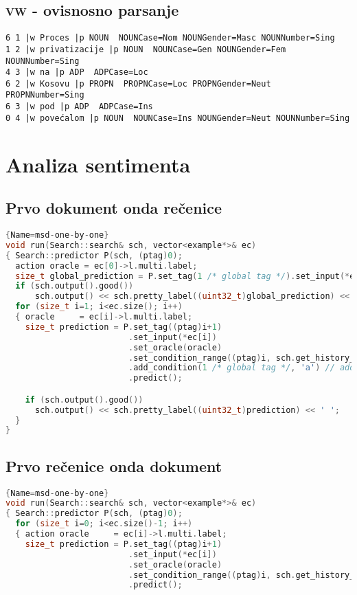 \begin{appendix}
\section{\textsc{vw} - ovisnosno parsanje}
\begin{lstlisting}[basicstyle=\tiny\ttfamily]
6 1 |w Proces |p NOUN  NOUNCase=Nom NOUNGender=Masc NOUNNumber=Sing
1 2 |w privatizacije |p NOUN  NOUNCase=Gen NOUNGender=Fem NOUNNumber=Sing
4 3 |w na |p ADP  ADPCase=Loc
6 2 |w Kosovu |p PROPN  PROPNCase=Loc PROPNGender=Neut PROPNNumber=Sing
6 3 |w pod |p ADP  ADPCase=Ins
0 4 |w povećalom |p NOUN  NOUNCase=Ins NOUNGender=Neut NOUNNumber=Sing
\end{lstlisting}

\chapter{Analiza sentimenta}\label{appendix:sentiment}
\section{Prvo dokument onda rečenice}
\begin{lstlisting}[language=C++,
                   basicstyle=\tiny\ttfamily]{Name=msd-one-by-one}
void run(Search::search& sch, vector<example*>& ec)
{ Search::predictor P(sch, (ptag)0);
  action oracle = ec[0]->l.multi.label;
  size_t global_prediction = P.set_tag(1 /* global tag */).set_input(*ec[0]).set_oracle(oracle).predict();
  if (sch.output().good())
      sch.output() << sch.pretty_label((uint32_t)global_prediction) << ' ';
  for (size_t i=1; i<ec.size(); i++)
  { oracle     = ec[i]->l.multi.label;
    size_t prediction = P.set_tag((ptag)i+1)
                         .set_input(*ec[i])
                         .set_oracle(oracle)
                         .set_condition_range((ptag)i, sch.get_history_length(), 'p')
                         .add_condition(1 /* global tag */, 'a') // adds the global as condition on each sequence element
                         .predict();

    if (sch.output().good())
      sch.output() << sch.pretty_label((uint32_t)prediction) << ' ';
  }
}
\end{lstlisting}
\section{Prvo rečenice onda dokument}
\begin{lstlisting}[language=C++,
                   basicstyle=\tiny\ttfamily]{Name=msd-one-by-one}
void run(Search::search& sch, vector<example*>& ec)
{ Search::predictor P(sch, (ptag)0);
  for (size_t i=0; i<ec.size()-1; i++)
  { action oracle     = ec[i]->l.multi.label;
    size_t prediction = P.set_tag((ptag)i+1)
                         .set_input(*ec[i])
                         .set_oracle(oracle)
                         .set_condition_range((ptag)i, sch.get_history_length(), 'p')
                         .predict();


\end{lstlisting}
\end{appendix}
